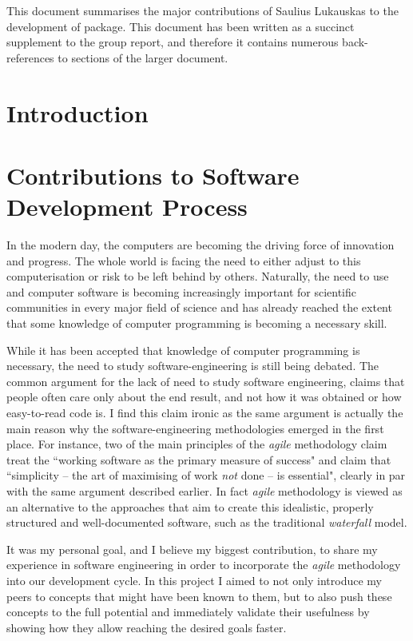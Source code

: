This document summarises the major contributions of Saulius Lukauskas
to the development of \means{} package.
This document has been written as a succinct supplement to the group report, and therefore it contains numerous back-references to sections of the larger document.

\section{Introduction}

\section{Contributions to Software Development Process}

In the modern day, the computers are becoming the driving force of innovation and progress. 
The whole world is facing the need to either adjust to this computerisation or risk to be left behind by others.
Naturally, the need to use and computer software is becoming increasingly important for scientific communities in every major field of science and has already reached the extent that some knowledge of computer programming is becoming a necessary skill.

While it has been accepted that knowledge of computer programming is necessary, the need to study software-engineering is still being debated. 
The common argument for the lack of need to study software engineering, claims that people often care only about the end result, and not how it was obtained or how easy-to-read code is. 
I find this claim ironic as the same argument is actually the main reason why the software-engineering methodologies emerged in the first place. 
For instance, two of the main principles of the \emph{agile} methodology\cite{_manifesto_????} claim treat the ``working software as the primary measure of success" and claim that ``simplicity -- the art of maximising of work \emph{not} done -- is essential"\cite{paulk_agile_2002}, clearly in par with the same argument described earlier. 
In fact \emph{agile} methodology is viewed as an alternative to the approaches that aim to create this idealistic, properly structured and well-documented software, such as the traditional \emph{waterfall} model.

It was my personal goal, and I believe my biggest contribution, to share my experience in software engineering in order to incorporate the \emph{agile} methodology into our development cycle. 
In this project I aimed to not only introduce my peers to concepts that might have been known to them, but to also push these concepts to the full potential and immediately validate their usefulness by showing how they allow reaching the desired goals faster. 

